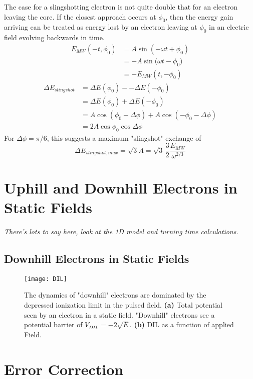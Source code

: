 \documentclass[aps,pra,preprint,groupedaddress]{revtex4-1}
\begin{document}
The case for a slingshotting electron is not quite double that for an electron leaving the core. If the closest approach occurs at $\phi_0$, then the energy gain arriving can be treated as energy lost by an electron leaving at $\phi_0$ in an electric field evolving backwards in time.
\begin{align*}
E_{MW}(-t,\phi_0) & = A \sin{(-\omega t + \phi_0)} \\
 & = -A\sin({\omega t - \phi_0)} \\
 & = -E_{MW}(t, -\phi_0)
\end{align*}
\begin{align*}
\Delta E_{slingshot} & = \Delta E(\phi_0) - -\Delta E(-\phi_0) \\
 & = \Delta E(\phi_0) + \Delta E(-\phi_0) \\
 & = A \cos{(\phi_0 - \Delta \phi)} + A \cos{(-\phi_0 - \Delta \phi)} \\
 & = 2 A \cos{\phi_0} \cos{\Delta \phi}
\end{align*}
For $\Delta \phi = \pi/6$, this suggests a maximum "slingshot" exchange of
\begin{equation*}
\Delta E_{slingshot,max} = \sqrt{3} A = \sqrt{3} \, \frac{3}{2} \frac{E_{MW}}{\omega^{2/3}}
\end{equation*}

\section{\label{sec:static} Uphill and Downhill Electrons in Static Fields}

\emph{There's lots to say here, look at the 1D model and turning time calculations.}

\subsection{\label{sec:DHstatic} Downhill Electrons in Static Fields}

\begin{figure}
\texttt{[image: DIL]}
\caption{\label{fig:DIL} The dynamics of "downhill" electrons are dominated by the depressed ionization limit in the pulsed field. \textbf{(a)} Total potential seen by an electron in a static field. "Downhill" electrons see a potential barrier of $V_{DIL} = -2\sqrt{E}$. \textbf{(b)} DIL as a function of applied Field.}
\end{figure}

\section{\label{sec:Err} Error Correction}
\end{document}
